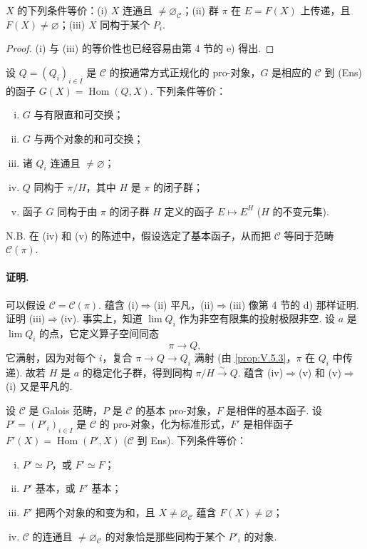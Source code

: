 \begin{corollary}\label{cor:V.5.4}
$X$ 的下列条件等价：(i) $X$ 连通且 $\neq \varnothing_{\mathcal{C}}$；(ii) 群 $\pi$ 在 $E = F(X)$ 上传递，且 $F(X) \neq \varnothing$；(iii) $X$ 同构于某个 $P_i$.
\end{corollary}

\begin{proof}
(i) 与 (iii) 的等价性也已经容易由第 4 节的 e) 得出.
\end{proof}

\begin{proposition}\label{prop:V.5.5}
设 $Q = (Q_i)_{i \in I}$ 是 $\mathcal{C}$ 的按通常方式正规化的 pro-对象，$G$ 是相应的 $\mathcal{C}$ 到 (Ens) 的函子 $G(X) = \operatorname{Hom}(Q, X)$. 下列条件等价：
\begin{enumerate}[(i)]
\item $G$ 与有限直和可交换；
\item $G$ 与两个对象的和可交换；
\item 诸 $Q_i$ 连通且 $\neq \varnothing$；
\item $Q$ 同构于 $\pi/H$，其中 $H$ 是 $\pi$ 的闭子群；
\item 函子 $G$ 同构于由 $\pi$ 的闭子群 $H$ 定义的函子 $E \mapsto E^{H}$ ($H$ 的不变元集).
\end{enumerate}
\end{proposition}

N.B. 在 (iv) 和 (v) 的陈述中，假设选定了基本函子，从而把 $\mathcal{C}$ 等同于范畴 $\mathcal{C}(\pi)$.

\paragraph*{证明.} 可以假设 $\mathcal{C} = \mathcal{C}(\pi)$. 蕴含 (i)$\Rightarrow$(ii) 平凡，(ii)$\Rightarrow$(iii) 像第 4 节的 d) 那样证明. 证明 (iii)$\Rightarrow$(iv). 事实上，知道 $\lim Q_i$ 作为非空有限集的投射极限非空. 设 $a$ 是 $\lim Q_i$ 的点，它定义算子空间同态
\[
\pi \longrightarrow Q,
\]
它满射，因为对每个 $i$，复合 $\pi \to Q \to Q_i$ 满射 (由 \ref{prop:V.5.3}，$\pi$ 在 $Q_i$ 中传递). 故若 $H$ 是 $a$ 的稳定化子群，得到同构 $\pi/H \xrightarrow{\sim} Q$. 蕴含 (iv)$\Rightarrow$(v) 和 (v)$\Rightarrow$(i) 又是平凡的.

\begin{proposition}\label{prop:V.5.6}
设 $\mathcal{C}$ 是 Galois 范畴，$P$ 是 $\mathcal{C}$ 的基本 pro-对象，$F$ 是相伴的基本函子. 设 $P' = (P'_i)_{i \in I}$ 是 $\mathcal{C}$ 的 pro-对象，化为标准形式，$F'$ 是相伴函子 $F'(X) = \operatorname{Hom}(P', X)$ ($\mathcal{C}$ 到 Ens). 下列条件等价：
\begin{enumerate}[(i)]
\item $P' \simeq P$，或 $F' \simeq F$；
\item $P'$ 基本，或 $F'$ 基本；
\item $F'$ 把两个对象的和变为和，且 $X \neq \varnothing_{\mathcal{C}}$ 蕴含 $F(X) \neq \varnothing$；
\item $\mathcal{C}$ 的连通且 $\neq \varnothing_{\mathcal{C}}$ 的对象恰是那些同构于某个 $P'_i$ 的对象.
\end{enumerate}
\end{proposition}

